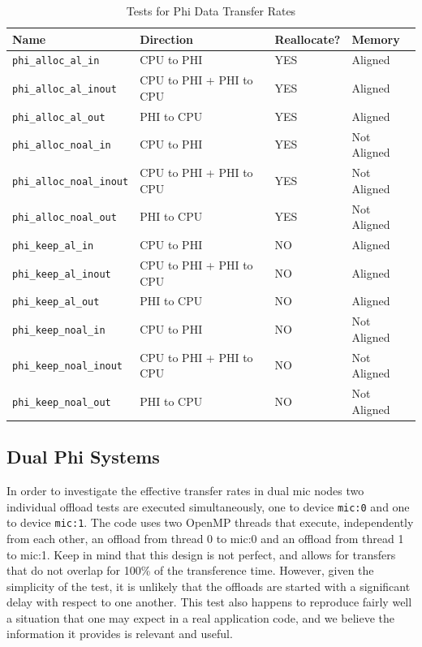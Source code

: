 \documentclass[10pt,a4paper]{report}
\begin{document}
\begin{table}[ht]
\centering
\caption{Tests for Phi Data Transfer Rates}
\label{tab:phi_bw}
\begin{tabular}{|l|l|l|l|}
\hline
\bf{Name}	                     & \bf{Direction}          & \bf{Reallocate?} & \bf{Memory}\\\hline
\texttt{phi\_alloc\_al\_in}      & CPU to PHI              & YES & Aligned\\
\texttt{phi\_alloc\_al\_inout}   & CPU to PHI + PHI to CPU & YES & Aligned\\
\texttt{phi\_alloc\_al\_out}     & PHI to CPU              & YES & Aligned\\
\texttt{phi\_alloc\_noal\_in}    & CPU to PHI              & YES & Not Aligned\\
\texttt{phi\_alloc\_noal\_inout} & CPU to PHI + PHI to CPU & YES & Not Aligned\\
\texttt{phi\_alloc\_noal\_out}   & PHI to CPU              & YES & Not Aligned\\
\texttt{phi\_keep\_al\_in}       & CPU to PHI              & NO  & Aligned\\
\texttt{phi\_keep\_al\_inout}    & CPU to PHI + PHI to CPU & NO  & Aligned\\
\texttt{phi\_keep\_al\_out}      & PHI to CPU              & NO  & Aligned\\
\texttt{phi\_keep\_noal\_in}     & CPU to PHI              & NO  & Not Aligned\\
\texttt{phi\_keep\_noal\_inout}  & CPU to PHI + PHI to CPU & NO  & Not Aligned\\
\texttt{phi\_keep\_noal\_out}    & PHI to CPU              & NO  & Not Aligned\\
\hline
\end{tabular}
\end{table}

\FloatBarrier
\subsection{Dual Phi Systems}
In order to investigate the effective transfer rates in dual mic nodes two individual offload tests are executed simultaneously, one to device \verb+mic:0+ and one to device \verb+mic:1+. The code uses two OpenMP threads that execute, independently from each other, an offload from thread 0 to mic:0 and an offload from thread 1 to mic:1. Keep in mind that this design is not perfect, and allows for transfers that do not overlap for 100\% of the transference time. However, given the simplicity of the test, it is unlikely that the offloads are started with a significant delay with respect to one another. This test also happens to  reproduce fairly well a situation that one may expect in a real application code, and we believe the information it provides is relevant and useful. 
\end{document}
